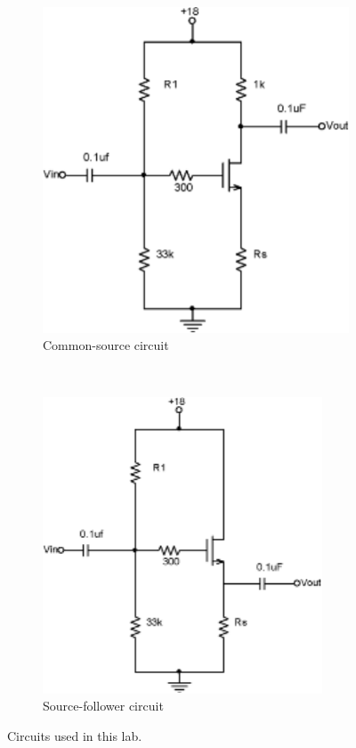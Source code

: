 \begin{figure}[hbtp]
  \centering
  \begin{subfigure}[b]{0.4\textwidth}
    \includegraphics[width=\textwidth]{common-source}
    \caption{\label{schem:common-source} Common-source circuit}
  \end{subfigure}%
  ~
  \begin{subfigure}[b]{0.4\textwidth}
    \includegraphics[width=\textwidth]{source-follower}
    \caption{\label{schem:source-follower} Source-follower circuit}
  \end{subfigure}
  \caption{\label{fig:schematics} Circuits used in this lab.}
\end{figure}

